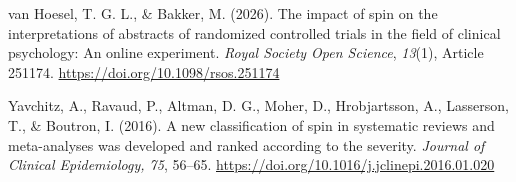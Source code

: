 \documentclass[authordate, meta]{jote-new-article}
\begin{document}
	van Hoesel, T. G. L., \& Bakker, M. (2026). The impact of spin on the interpretations of abstracts of randomized controlled trials in the field of clinical psychology: An online experiment. \emph{Royal Society Open Science}, \emph{13}(1), Article 251174. \url{https://doi.org/10.1098/rsos.251174}



	Yavchitz, A., Ravaud, P., Altman, D. G., Moher, D., Hrobjartsson, A., Lasserson, T., \& Boutron, I. (2016). A new classification of spin in systematic reviews and meta-analyses was developed and ranked according to the severity. \emph{Journal of Clinical Epidemiology, 75}, 56--65. \url{https://doi.org/10.1016/j.jclinepi.2016.01.020}
\end{document}
